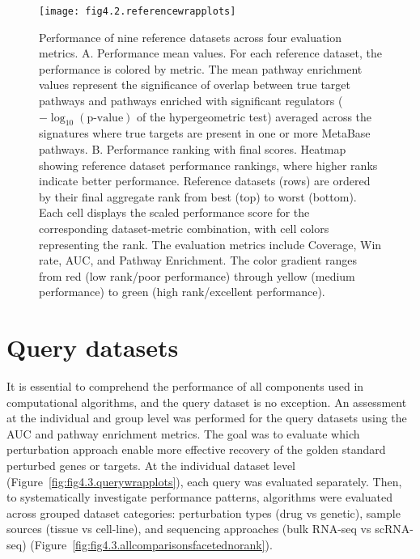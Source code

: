 \begin{figure}[htbp]
    \centering
    \texttt{[image: fig4.2.referencewrapplots]}
    \caption[Performance of nine reference datasets across four evaluation metrics.]{Performance of nine reference datasets across four evaluation metrics. A. Performance mean values. For each reference dataset, the performance is colored by metric. The mean pathway enrichment values represent the significance of overlap between true target pathways and pathways enriched with significant regulators ($-\log_{10}(\text{p-value})$ of the hypergeometric test) averaged across the signatures where true targets are present in one or more MetaBase pathways. B. Performance ranking with final scores. Heatmap showing reference dataset performance rankings, where higher ranks indicate better performance. Reference datasets (rows) are ordered by their final aggregate rank from best (top) to worst (bottom). Each cell displays the scaled performance score for the corresponding dataset-metric combination, with cell colors representing the rank. The evaluation metrics include Coverage, Win rate, \gls{AUC}, and Pathway Enrichment. The color gradient ranges from red (low rank/poor performance) through yellow (medium performance) to green (high rank/excellent performance).}
    \label{fig:fig4.2.referencewrapplots}
\end{figure}

\section{Query datasets} %
\label{sec:querydatasetsresults}

It is essential to comprehend the performance of all components used in computational algorithms, and the query dataset is no exception.
An assessment at the individual and group level was performed for the query datasets using the \gls{AUC} and pathway enrichment metrics.
The goal was to evaluate which perturbation approach enable more effective recovery of the golden standard perturbed genes or targets.
At the individual dataset level (Figure~\ref{fig:fig4.3.querywrapplots}), each query was evaluated separately.
Then, to systematically investigate performance patterns, algorithms were evaluated across grouped dataset categories: perturbation types (drug vs genetic), sample sources (tissue vs cell-line), and sequencing approaches (bulk \gls{RNA-seq} vs \gls{scRNA-seq}) (Figure~\ref{fig:fig4.3.allcomparisonsfacetednorank}).

